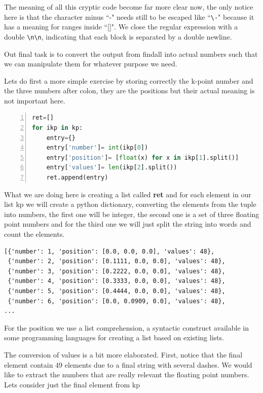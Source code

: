 The meaning of all this cryptic code become far more clear now, the only notice here is that the character minus ``-" needs still to be escaped like ``\verb|\-|" because it has a meaning for ranges inside ``[]". We close the regular expression with a double \verb|\n\n|, indicating that each block is separated by a double newline.

Out final task is to convert the output from findall into actual numbers such that we can manipulate them for whatever purpose we need.

Lets do first a more simple exercise by storing correctly the k-point number and the three numbers after colon, they are the positions but their actual meaning is not important here.

\begin{lstlisting}[language=Python, numbers=left]
ret=[]
for ikp in kp:
    entry={}
    entry['number']= int(ikp[0])
    entry['position']= [float(x) for x in ikp[1].split()]
    entry['values']= len(ikp[2].split())
    ret.append(entry)
\end{lstlisting}

What we are doing here is creating a list called \textbf{ret}
and for each element in our list kp we will create a python dictionary, converting the elements from the tuple into numbers, the first one will be integer, the second one is a set of three floating point numbers and for the third one we will just split the string into words and count the elements.

\begin{lstlisting}
[{'number': 1, 'position': [0.0, 0.0, 0.0], 'values': 48},
 {'number': 2, 'position': [0.1111, 0.0, 0.0], 'values': 48},
 {'number': 3, 'position': [0.2222, 0.0, 0.0], 'values': 48},
 {'number': 4, 'position': [0.3333, 0.0, 0.0], 'values': 48},
 {'number': 5, 'position': [0.4444, 0.0, 0.0], 'values': 48},
 {'number': 6, 'position': [0.0, 0.0909, 0.0], 'values': 48},
...
\end{lstlisting}

For the position we use a list comprehension, a syntactic construct available in some programming languages for creating a list based on existing lists.

The conversion of values is a bit more elaborated. First, notice that the final element contain 49 elements due to a final string with several dashes. We would like to extract the numbers that are really relevant the floating point numbers. Lets consider just the final element from kp

